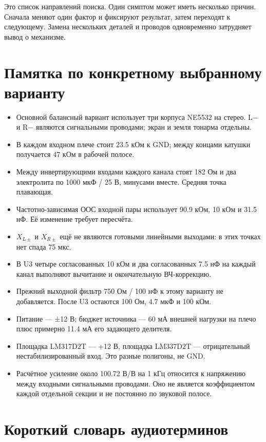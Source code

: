 \documentclass[a4paper,11pt]{article}
\begin{document}
Это список направлений поиска. Один симптом может иметь несколько причин.
Сначала меняют один фактор и фиксируют результат, затем переходят к следующему.
Замена нескольких деталей и проводов одновременно затрудняет вывод о механизме.

\section{Памятка по конкретному выбранному варианту}

\begin{itemize}
\item Основной балансный вариант использует три корпуса NE5532 на стерео.
L− и R− являются сигнальными проводами; экран и земля тонарма отдельны.
\item В каждом входном плече стоит 23.5 кОм к GND; между концами катушки
получается 47 кОм в рабочей полосе.
\item Между инвертирующими входами каждого канала стоят 182 Ом и два
электролита по 1000 мкФ / 25 В, минусами вместе. Средняя точка плавающая.
\item Частотно-зависимая ООС входной пары использует 90.9 кОм,
10 кОм и 31.5 нФ. Её изменение требует пересчёта.
\item $X_{L\pm}$ и $X_{R\pm}$ ещё не являются готовыми линейными выходами:
в этих точках нет спада 75 мкс.
\item В U3 четыре согласованных 10 кОм и два согласованных 7.5 нФ
на каждый канал выполняют вычитание и окончательную ВЧ-коррекцию.
\item Прежний выходной фильтр 750 Ом / 100 нФ к этому варианту не добавляется.
После U3 остаются 100 Ом, 4.7 мкФ и 100 кОм.
\item Питание — ±12 В; бюджет источника — 60 мА внешней нагрузки на плечо
плюс примерно 11.4 мА его задающего делителя.
\item Площадка LM317D2T — +12 В, площадка LM337D2T — отрицательный
нестабилизированный вход. Это разные полигоны, не GND.
\item Расчётное усиление около 100.72 В/В на 1 кГц относится к напряжению
между входными сигнальными проводами. Оно не является коэффициентом
каждой отдельной секции и не постоянно по звуковой полосе.
\end{itemize}

\section{Короткий словарь аудиотерминов}
\end{document}
